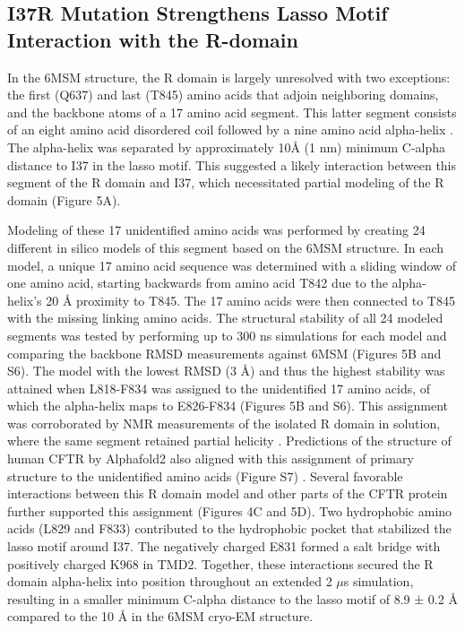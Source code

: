 \subsection{I37R Mutation Strengthens Lasso Motif Interaction with the R-domain}

In the 6MSM structure, the R domain is largely unresolved with two exceptions: the first (Q637) and last (T845) amino acids that adjoin neighboring domains, and the backbone atoms of a 17 amino acid segment. This latter segment consists of an eight amino acid disordered coil followed by a nine amino acid alpha-helix \cite{zhang2018a}. The alpha-helix was separated by approximately 10$\mbox{\AA}$ (1 nm) minimum C-alpha distance to I37 in the lasso motif. This suggested a likely interaction between this segment of the R domain and I37, which necessitated partial modeling of the R domain (Figure 5A).

Modeling of these 17 unidentified amino acids was performed by creating 24 different in silico models of this segment based on the 6MSM structure. In each model, a unique 17 amino acid sequence was determined with a sliding window of one amino acid, starting backwards from amino acid T842 due to the alpha-helix’s 20 $\mbox{\AA}$ proximity to T845. The 17 amino acids were then connected to T845 with the missing linking amino acids. The structural stability of all 24 modeled segments was tested by performing up to 300 ns simulations for each model and comparing the backbone RMSD measurements against 6MSM (Figures 5B and S6). The model with the lowest RMSD (3 $\mbox{\AA}$) and thus the highest stability was attained when L818-F834 was assigned to the unidentified 17 amino acids, of which the alpha-helix maps to E826-F834 (Figures 5B and S6). This assignment was corroborated by NMR measurements of the isolated R domain in solution, where the same segment retained partial helicity \cite{baker2007}. Predictions of the structure of human CFTR by Alphafold2 also aligned with this assignment of primary structure to the unidentified amino acids (Figure S7) \cite{jumper2021}. Several favorable interactions between this R domain model and other parts of the CFTR protein further supported this assignment (Figures 4C and 5D). Two hydrophobic amino acids (L829 and F833) contributed to the hydrophobic pocket that stabilized the lasso motif around I37. The negatively charged E831 formed a salt bridge with positively charged K968 in TMD2. Together, these interactions secured the R domain alpha-helix into position throughout an extended 2 $\mu$s simulation, resulting in a smaller minimum C-alpha distance to the lasso motif of 8.9 ± 0.2 $\mbox{\AA}$ compared to the 10 $\mbox{\AA}$ in the 6MSM cryo-EM structure.

